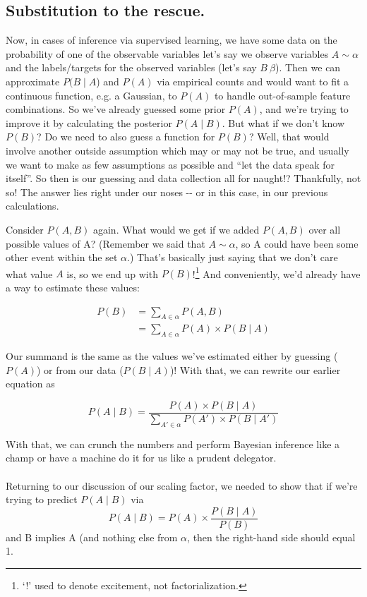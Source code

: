 \documentclass[../main/main.tex]{subfiles}
\begin{document}
\subsection*{Substitution to the rescue.}\label{subsitution-to-the-rescue}
Now, in cases of inference via supervised learning, 
we have some data on the probability of one of the observable variables
\textemdash{} let's say we observe variables \(A \sim \alpha\) \textemdash{}
and the labels/targets for the observed variables (let's say \(B ~ \beta\)).
Then we can approximate \(P(B \mid A\)) and \(P(A)\) via empirical counts \textemdash{}
and would want to fit a continuous function, e.g. a Gaussian, to \(P(A)\) to
handle out-of-sample feature combinations.
So we've already guessed some prior \(P(A)\), and we're trying to improve it by
calculating the posterior \( P(A \mid B) \). But what if we don't know
\( P(B) \)? Do we need to also guess a function for \( P(B) \)? Well, that would
involve another outside assumption which may or may not be true, and usually we want
to make as few assumptions as possible and
``let the data speak for itself''.
So then is our guessing and data collection all for naught!?
Thankfully, not so! The answer lies right under our noses -\/- or in
this case, in our previous calculations.

Consider \(P(A,B)\) again. What would we get if we added \(P(A,B)\) over
all possible values of A? (Remember we said that \(A \sim \alpha\), so A
could have been some other event within the set \(\alpha\).) That's
basically just saying that we don't care what value \(A\) is, so we end
up with \(P(B)\)!\footnote{
  `!' used to denote excitement, not factorialization.
  }
And conveniently, we'd already have a way to estimate these values:

\[\begin{split} P(B) &= \sum_{A \in \alpha} P(A,B) \\
                     &= \sum_{A \in \alpha} P(A) \times P(B \mid A)          \end{split}\]

Our summand is the same as the values we've estimated either by guessing
(\(P(A)\)) or from our data (\(P(B \mid A)\))! With that, we can rewrite
our earlier equation as

\[ P(A \mid B) = 
  \frac{P(A) \times P(B \mid A)} {\sum_{A' \in \alpha} P(A') \times P(B \mid A')} \]

With that, we can crunch the numbers and perform Bayesian inference like
a champ or have a machine do it for us like a prudent delegator.
\\
\\
Returning to our discussion of our scaling factor, we needed to show that if
we're trying to predict \(P(A \mid B)\) via
\[P(A \mid B) = P(A) \times \frac {P(B \mid A)} {P(B)} \]
and B implies A (and nothing else from \(\alpha\), then the right-hand side should equal 1.
\end{document}

